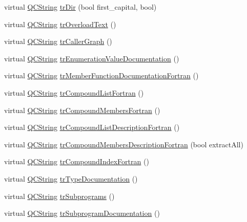 \begin{DoxyCompactItemize}
\item 
virtual \hyperlink{class_q_c_string}{Q\-C\-String} \hyperlink{class_translator_indonesian_abd733765f737e1f4d5d60e55f0907e72}{tr\-Dir} (bool first\-\_\-capital, bool)
\item 
virtual \hyperlink{class_q_c_string}{Q\-C\-String} \hyperlink{class_translator_indonesian_ac5436cb286c48cd540d0cdce200a82b9}{tr\-Overload\-Text} ()
\item 
virtual \hyperlink{class_q_c_string}{Q\-C\-String} \hyperlink{class_translator_indonesian_ae1d7d38cc426cd25124b1658b1125841}{tr\-Caller\-Graph} ()
\item 
virtual \hyperlink{class_q_c_string}{Q\-C\-String} \hyperlink{class_translator_indonesian_a4039294191fddf0e9530b920719998fd}{tr\-Enumeration\-Value\-Documentation} ()
\item 
virtual \hyperlink{class_q_c_string}{Q\-C\-String} \hyperlink{class_translator_indonesian_a006270b30df57f83fe40ad0ed617652e}{tr\-Member\-Function\-Documentation\-Fortran} ()
\item 
virtual \hyperlink{class_q_c_string}{Q\-C\-String} \hyperlink{class_translator_indonesian_a17985bd956c4940e53e169cadb659c2b}{tr\-Compound\-List\-Fortran} ()
\item 
virtual \hyperlink{class_q_c_string}{Q\-C\-String} \hyperlink{class_translator_indonesian_add44aa8baf655554ec74dbfac0d43f71}{tr\-Compound\-Members\-Fortran} ()
\item 
virtual \hyperlink{class_q_c_string}{Q\-C\-String} \hyperlink{class_translator_indonesian_a10aa72b35051f95ba30f2b0312ce705c}{tr\-Compound\-List\-Description\-Fortran} ()
\item 
virtual \hyperlink{class_q_c_string}{Q\-C\-String} \hyperlink{class_translator_indonesian_a0c98da65b5772e9c2876855a42d44127}{tr\-Compound\-Members\-Description\-Fortran} (bool extract\-All)
\item 
virtual \hyperlink{class_q_c_string}{Q\-C\-String} \hyperlink{class_translator_indonesian_a933624b6cffb8fdc03e9fc4110640fc9}{tr\-Compound\-Index\-Fortran} ()
\item 
virtual \hyperlink{class_q_c_string}{Q\-C\-String} \hyperlink{class_translator_indonesian_ae031421205271f1a32fa3838a79b8902}{tr\-Type\-Documentation} ()
\item 
virtual \hyperlink{class_q_c_string}{Q\-C\-String} \hyperlink{class_translator_indonesian_a8d4e1de8fb5c2af1fd073c682556f999}{tr\-Subprograms} ()
\item 
virtual \hyperlink{class_q_c_string}{Q\-C\-String} \hyperlink{class_translator_indonesian_add6df0842eb6016d108814567d677055}{tr\-Subprogram\-Documentation} ()

\end{DoxyCompactItemize}
